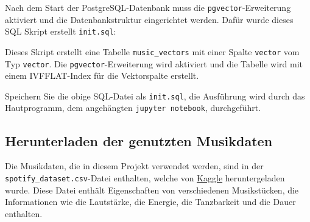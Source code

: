 Nach dem Start der PostgreSQL-Datenbank muss die \texttt{pgvector}-Erweiterung aktiviert und die Datenbankstruktur eingerichtet werden. Dafür wurde dieses SQL Skript erstellt \texttt{init.sql}:



Dieses Skript erstellt eine Tabelle \texttt{music\_vectors} mit einer Spalte \texttt{vector} vom Typ \texttt{vector}. Die \texttt{pgvector}-Erweiterung wird aktiviert und die Tabelle wird mit einem IVFFLAT-Index für die Vektorspalte erstellt. 

Speichern Sie die obige SQL-Datei als \texttt{init.sql}, die Ausführung wird durch das Hautprogramm, dem angehängten \texttt{jupyter notebook}, durchgeführt.

\subsection{Herunterladen der genutzten Musikdaten}

Die Musikdaten, die in diesem Projekt verwendet werden, sind in der \texttt{spotify\_dataset.csv}-Datei enthalten, welche von \href{https://www.kaggle.com/datasets/bricevergnou/spotify-recommendation}{Kaggle} heruntergeladen wurde. Diese Datei enthält Eigenschaften von verschiedenen Musikstücken, die Informationen wie die Lautstärke, die Energie, die Tanzbarkeit und die Dauer enthalten.